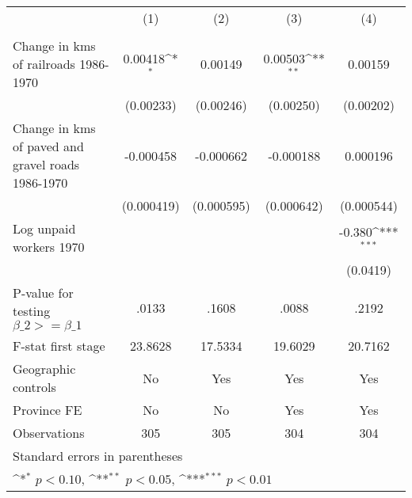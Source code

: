 {
\def\sym#1{\ifmmode^{#1}\else\(^{#1}\)\fi}
\begin{tabular}{l*{4}{c}}
\hline\hline
                &\multicolumn{1}{c}{(1)}&\multicolumn{1}{c}{(2)}&\multicolumn{1}{c}{(3)}&\multicolumn{1}{c}{(4)}\\
                &\multicolumn{1}{c}{}&\multicolumn{1}{c}{}&\multicolumn{1}{c}{}&\multicolumn{1}{c}{}\\
\hline
Change in kms of railroads 1986-1970&  0.00418\sym{*}  &  0.00149         &  0.00503\sym{**} &  0.00159         \\
                &(0.00233)         &(0.00246)         &(0.00250)         &(0.00202)         \\
[1em]
Change in kms of paved and gravel roads 1986-1970&-0.000458         &-0.000662         &-0.000188         & 0.000196         \\
                &(0.000419)         &(0.000595)         &(0.000642)         &(0.000544)         \\
[1em]
Log unpaid workers 1970&                  &                  &                  &   -0.380\sym{***}\\
                &                  &                  &                  & (0.0419)         \\
\hline
P-value for testing $\beta\_{2} >= \beta\_{1}$&    .0133         &    .1608         &    .0088         &    .2192         \\
F-stat first stage&  23.8628         &  17.5334         &  19.6029         &  20.7162         \\
Geographic controls&       No         &      Yes         &      Yes         &      Yes         \\
Province FE     &       No         &       No         &      Yes         &      Yes         \\
Observations    &      305         &      305         &      304         &      304         \\
\hline\hline
\multicolumn{5}{l}{\footnotesize Standard errors in parentheses}\\
\multicolumn{5}{l}{\footnotesize \sym{*} \(p<0.10\), \sym{**} \(p<0.05\), \sym{***} \(p<0.01\)}\\
\end{tabular}
}
